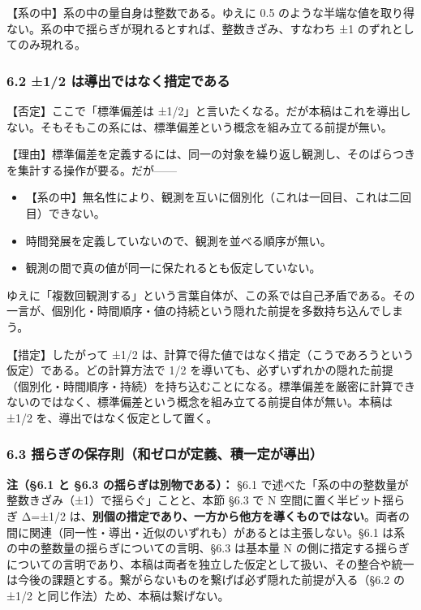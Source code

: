 \documentclass[11pt]{ltjsarticle}
\providecommand{\tightlist}{\setlength{\itemsep}{0pt}\setlength{\parskip}{0pt}}
\begin{document}
【系の中】系の中の量自身は整数である。ゆえに 0.5
のような半端な値を取り得ない。系の中で揺らぎが現れるとすれば、整数きざみ、すなわち
±1 のずれとしてのみ現れる。

\subsubsection{6.2 ±1/2
は導出ではなく措定である}\label{ux306fux5c0eux51faux3067ux306fux306aux304fux63aaux5b9aux3067ux3042ux308b}

【否定】ここで「標準偏差は
±1/2」と言いたくなる。だが本稿はこれを導出しない。そもそもこの系には、標準偏差という概念を組み立てる前提が無い。

【理由】標準偏差を定義するには、同一の対象を繰り返し観測し、そのばらつきを集計する操作が要る。だが------

\begin{itemize}
\tightlist
\item
  【系の中】無名性により、観測を互いに個別化（これは一回目、これは二回目）できない。
\item
  時間発展を定義していないので、観測を並べる順序が無い。
\item
  観測の間で真の値が同一に保たれるとも仮定していない。
\end{itemize}

ゆえに「複数回観測する」という言葉自体が、この系では自己矛盾である。その一言が、個別化・時間順序・値の持続という隠れた前提を多数持ち込んでしまう。

【措定】したがって ±1/2
は、計算で得た値ではなく措定（こうであろうという仮定）である。どの計算方法で
1/2
を導いても、必ずいずれかの隠れた前提（個別化・時間順序・持続）を持ち込むことになる。標準偏差を厳密に計算できないのではなく、標準偏差という概念を組み立てる前提自体が無い。本稿は
±1/2 を、導出ではなく仮定として置く。

\subsubsection{6.3
揺らぎの保存則（和ゼロが定義、積一定が導出）}\label{ux63faux3089ux304eux306eux4fddux5b58ux5247ux548cux30bcux30edux304cux5b9aux7fa9ux7a4dux4e00ux5b9aux304cux5c0eux51fa}

\textbf{注（§6.1 と §6.3 の揺らぎは別物である）：} §6.1
で述べた「系の中の整数量が整数きざみ（±1）で揺らぐ」ことと、本節 §6.3 で
N 空間に置く半ビット揺らぎ Δ=±1/2
は、\textbf{別個の措定であり、一方から他方を導くものではない}。両者の間に関連（同一性・導出・近似のいずれも）があるとは主張しない。§6.1
は系の中の整数量の揺らぎについての言明、§6.3 は基本量 N
の側に措定する揺らぎについての言明であり、本稿は両者を独立した仮定として扱い、その整合や統一は今後の課題とする。繋がらないものを繋げば必ず隠れた前提が入る（§6.2
の ±1/2 と同じ作法）ため、本稿は繋げない。
\end{document}
